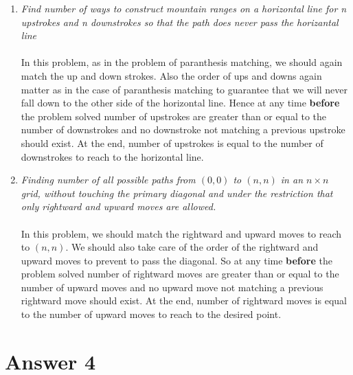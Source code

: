 \documentclass[12pt]{article}
\begin{document}
\begin{enumerate}
\item{\textit{Find number of ways to construct mountain ranges on a horizontal line for n upstrokes and n downstrokes so that the path does never pass the horizantal line}}\\ \\
In this problem, as in the problem of paranthesis matching, we should again match the up and down strokes. Also the order of ups and downs again matter as in the case of paranthesis matching to guarantee that we will never fall down to the other side of the horizontal line. Hence at any time \textbf{before} the problem solved number of upstrokes are greater than or equal to the number of downstrokes and no downstroke not matching a previous upstroke should exist. At the end, number of upstrokes is equal to the number of downstrokes to reach to the horizontal line.
\item{\textit{Finding number of all possible paths from $(0,0)$ to $(n,n)$ in an $n\times n$ grid, without touching the primary diagonal and under the restriction that only rightward and upward moves are allowed.}}\\ \\
In this problem, we should match the rightward and upward moves to reach to $(n,n)$. We should also take care of the order of the rightward and upward moves to prevent to pass the diagonal. So at any time \textbf{before} the problem solved number of rightward moves are greater than or equal to the number of upward moves and no upward move not matching a previous rightward move should exist. At the end, number of rightward moves is equal to the number of upward moves to reach to the desired point.

\end{enumerate}

\section*{Answer 4}
\end{document}

